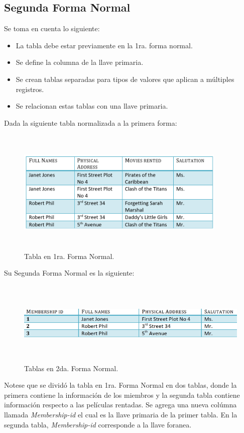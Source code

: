 \documentclass[letterpaper, 12pt]{article}
\begin{document}
\begin{justify}
        \section{Segunda Forma Normal}
        \justify
        Se toma en cuenta lo siguiente:
        \begin{itemize}
            \item La tabla debe estar previamente en la 1ra. forma normal.
            \item Se define la columna de la llave primaria.
            \item Se crean tablas separadas para tipos de valores que aplican a múltiples registros.
            \item Se relacionan estas tablas con una llave primaria.
        \end{itemize}
        \justify
        Dada la siguiente tabla normalizada a la primera forma:
        \begin{figure}[H]
            \centering
            \includegraphics[width=10cm,height=6cm]{1NF.png}
            \caption{Tabla en 1ra. Forma Normal.}
        \end{figure}
        \justify
        Su Segunda Forma Normal es la siguiente:
        \begin{figure}[H]
            \centering
            \includegraphics[width=12cm,height=4cm]{2NF.png}
            \caption{Tablas en 2da. Forma Normal.}
        \end{figure}
        \justify
        Notese que se dividó la tabla en 1ra. Forma Normal en dos tablas, donde la primera contiene la información de los miembros
        y la segunda tabla contiene información respecto a las películas rentadas. Se agrega una nueva colúmna llamada 
        \emph{Membership-id} el cual es la llave primaria de la primer tabla. En la segunda tabla, \emph{Membership-id} corresponde a la llave foranea.

\end{justify}
\end{document}

